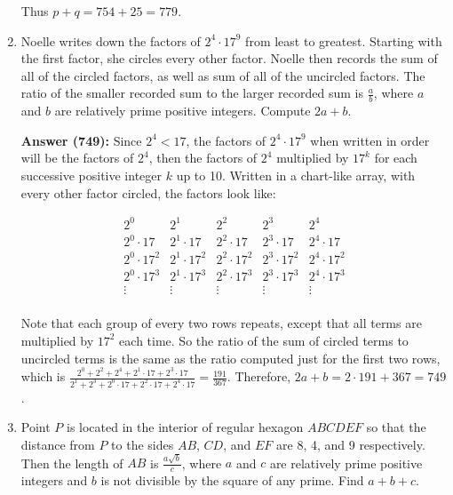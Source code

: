 \documentclass{article}
\begin{document}
\begin{enumerate}
Thus $p+q=754+25=\boxed{779}$.

\newpage

\item Noelle writes down the factors of $2^4 \cdot 17^9$ from least to greatest. Starting with the first factor, she circles every other factor. Noelle then records the sum of all of the circled factors, as well as sum of all of the uncircled factors. The ratio of the smaller recorded sum to the larger recorded sum is $\frac{a}{b}$, where $a$ and $b$ are relatively prime positive integers. Compute $2a+b$.

\textbf{Answer (749):} Since $2^4 < 17$, the factors of $2^4 \cdot 17^9$ when written in order will be the factors of $2^4$, then the factors of $2^4$ multiplied by $17^k$ for each successive positive integer $k$ up to 10. Written in a chart-like array, with every other factor circled, the factors look like:

\[ 
\begin{matrix}
    \boxed{2^0} & 2^1 & \boxed{2^2} & 2^3 & \boxed{2^4} \\
    2^0 \cdot 17 & \boxed{2^1 \cdot 17} & 2^2 \cdot 17 & \boxed{2^3 \cdot 17} & 2^4 \cdot 17 \\
    \boxed{2^0 \cdot 17^2} & 2^1 \cdot 17^2 & \boxed{2^2 \cdot 17^2} & 2^3 \cdot 17^2 & \boxed{2^4 \cdot 17^2} \\
    2^0 \cdot 17^3 & \boxed{2^1 \cdot 17^3} & 2^2 \cdot 17^3 & \boxed{2^3 \cdot 17^3} & 2^4 \cdot 17^3 \\
    \vdots & \vdots & \vdots & \vdots & \vdots \\
\end{matrix}
\]

Note that each group of every two rows repeats, except that all terms are multiplied by $17^2$ each time. So the ratio of the sum of circled terms to uncircled terms is the same as the ratio computed just for the first two rows, which is $\frac{2^0+2^2+2^4+2^1 \cdot 17+2^3 \cdot 17}{2^1+2^3+2^0 \cdot 17+2^2 \cdot 17+2^4 \cdot 17} = \frac{191}{367}$. Therefore, $2a+b=2 \cdot 191+367=\boxed{749}$.

\item Point $P$ is located in the interior of regular hexagon $ABCDEF$ so that the distance from $P$ to the sides $AB$, $CD$, and $EF$ are 8, 4, and 9 respectively. Then the length of $AB$ is $\frac{a\sqrt{b}}{c}$, where $a$ and $c$ are relatively prime positive integers and $b$ is not divisible by the square of any prime. Find $a+b+c$.


\end{enumerate}
\end{document}
